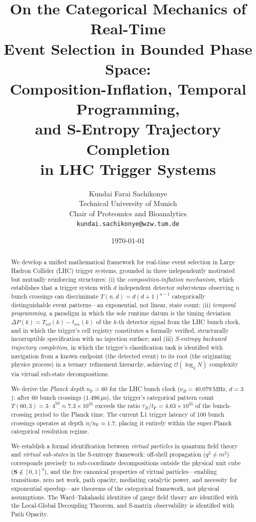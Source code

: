 \documentclass[twocolumn,10pt,a4paper]{article}
\title{\textbf{On the Categorical Mechanics of Real-Time\\
Event Selection in Bounded Phase Space:\\
Composition-Inflation, Temporal Programming,\\
and S-Entropy Trajectory Completion\\
in LHC Trigger Systems}}
\author{
Kundai Farai Sachikonye\\
Technical University of Munich\\
Chair of Proteomics and Bioanalytics\\
\texttt{kundai.sachikonye@wzw.tum.de}
}
\date{\today}
\theoremstyle{thmstyle}
\theoremstyle{definition}
\theoremstyle{remark}
\newcommand{\tP}{t_{\mathrm{P}}}
\newcommand{\nP}{n_{\mathrm{P}}}
\newcommand{\dP}{\Delta P}
\begin{document}
\maketitle

\begin{abstract}
\noindent
We develop a unified mathematical framework for real-time event selection
in Large Hadron Collider (LHC) trigger systems, grounded in three
independently motivated but mutually reinforcing structures: (i) the
\emph{composition-inflation mechanism}, which establishes that a trigger
system with $d$ independent detector subsystems observing $n$ bunch
crossings can discriminate $T(n,d) = d(d+1)^{n-1}$ categorically
distinguishable event patterns---an exponential, not linear, state
count; (ii) \emph{temporal programming}, a paradigm in which the sole
runtime datum is the timing deviation $\dP(k) = T_{\mathrm{ref}}(k) -
t_{\mathrm{rec}}(k)$ of the $k$-th detector signal from the LHC bunch
clock, and in which the trigger's cell registry constitutes a formally
verified, structurally incorruptible specification with no injection
surface; and (iii) \emph{S-entropy backward trajectory completion}, in
which the trigger's classification task is identified with navigation
from a known endpoint (the detected event) to its root (the originating
physics process) in a ternary refinement hierarchy, achieving
$\mathcal{O}(\log_3 N)$ complexity via virtual sub-state decompositions.

We derive the \emph{Planck depth} $\nP = 60$ for the LHC bunch clock
($\nu_B = 40.079\,\mathrm{MHz}$, $d = 3$): after 60 bunch crossings
($1.496\,\mu\mathrm{s}$), the trigger's categorical pattern count
$T(60,3) = 3 \cdot 4^{59} \approx 7.3 \times 10^{35}$ exceeds the
ratio $\tau_B/\tP = 4.63 \times 10^{35}$ of the bunch-crossing period
to the Planck time. The current L1 trigger latency of 100 bunch
crossings operates at depth $n/\nP \approx 1.7$, placing it entirely
within the super-Planck categorical resolution regime.

We establish a formal identification between \emph{virtual particles}
in quantum field theory and \emph{virtual sub-states} in the S-entropy
framework: off-shell propagation ($q^2 \neq m^2$) corresponds
precisely to sub-coordinate decompositions outside the physical unit
cube ($\mathbf{S} \notin [0,1]^3$), and the five canonical properties
of virtual particles---enabling transitions, zero net work, path
opacity, mediating catalytic power, and necessity for exponential
speedup---are theorems of the categorical framework, not physical
assumptions. The Ward--Takahashi identities of gauge field theory are
identified with the Local-Global Decoupling Theorem, and S-matrix
observability is identified with Path Opacity.


\end{abstract}
\end{document}
